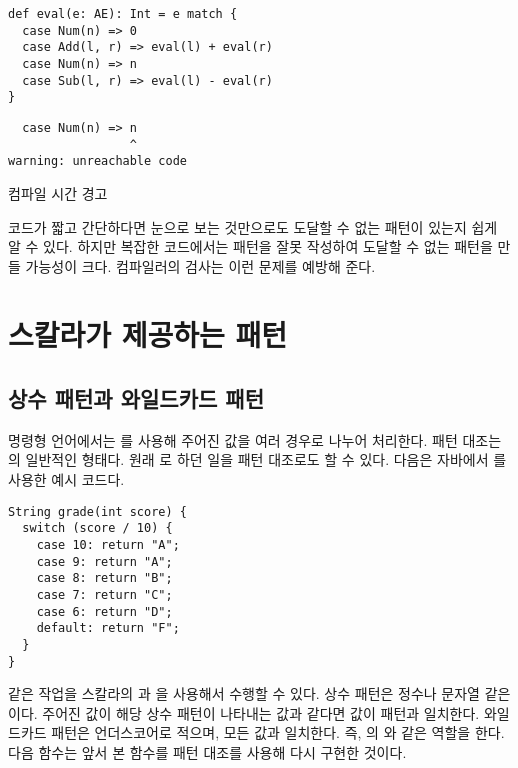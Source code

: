 \begin{verbatim}
def eval(e: AE): Int = e match {
  case Num(n) => 0
  case Add(l, r) => eval(l) + eval(r)
  case Num(n) => n
  case Sub(l, r) => eval(l) - eval(r)
}
\end{verbatim}
\vspace{-1em}
\begin{mdframed}[hidealllines=true,backgroundcolor=gray!10,innerleftmargin=3pt,innerrightmargin=3pt,leftmargin=-3pt,rightmargin=-3pt]
\begin{verbatim}
  case Num(n) => n
                 ^
warning: unreachable code
\end{verbatim}
\vspace{-2em}
\begin{flushright}
\scriptsize\textsf{컴파일 시간 경고}
\end{flushright}
\end{mdframed}

코드가 짧고 간단하다면 눈으로 보는 것만으로도 도달할 수 없는 패턴이 있는지 쉽게
알 수 있다. 하지만 복잡한 코드에서는 패턴을 잘못 작성하여 도달할 수 없는 패턴을
만들 가능성이 크다. 컴파일러의  검사는 이런
문제를 예방해 준다.

\section{스칼라가 제공하는 패턴}

\subsection{상수 패턴과 와일드카드 패턴}

명령형 언어에서는 를 사용해 주어진 값을 여러 경우로 나누어
처리한다. 패턴 대조는 의 일반적인 형태다. 원래
로 하던 일을 패턴 대조로도 할 수 있다. 다음은 자바에서
를 사용한 예시 코드다.

\begin{verbatim}
String grade(int score) {
  switch (score / 10) {
    case 10: return "A";
    case 9: return "A";
    case 8: return "B";
    case 7: return "C";
    case 6: return "D";
    default: return "F";
  }
}
\end{verbatim}

같은 작업을 스칼라의 과 을 사용해서 수행할 수 있다. 상수 패턴은 정수나 문자열
같은 이다. 주어진 값이 해당 상수 패턴이 나타내는 값과
같다면 값이 패턴과 일치한다. 와일드카드 패턴은 언더스코어로 적으며, 모든 값과
일치한다. 즉, 의 와 같은 역할을 한다. 다음
함수는 앞서 본 함수를 패턴 대조를 사용해 다시 구현한 것이다.

